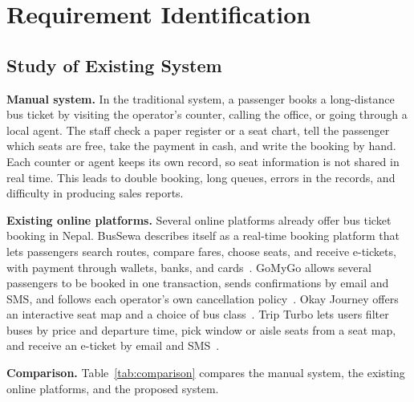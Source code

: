 
\section{Requirement Identification}

\subsection{Study of Existing System}

\textbf{Manual system.} In the traditional system, a passenger books a long-distance bus ticket by visiting the operator's counter, calling the office, or going through a local agent. The staff check a paper register or a seat chart, tell the passenger which seats are free, take the payment in cash, and write the booking by hand. Each counter or agent keeps its own record, so seat information is not shared in real time. This leads to double booking, long queues, errors in the records, and difficulty in producing sales reports.

\textbf{Existing online platforms.} Several online platforms already offer bus ticket booking in Nepal. BusSewa describes itself as a real-time booking platform that lets passengers search routes, compare fares, choose seats, and receive e-tickets, with payment through wallets, banks, and cards~\cite{bussewa}. GoMyGo allows several passengers to be booked in one transaction, sends confirmations by email and SMS, and follows each operator's own cancellation policy~\cite{gomygo}. Okay Journey offers an interactive seat map and a choice of bus class~\cite{okayjourney}. Trip Turbo lets users filter buses by price and departure time, pick window or aisle seats from a seat map, and receive an e-ticket by email and SMS~\cite{tripturbo}.

\textbf{Comparison.} Table~\ref{tab:comparison} compares the manual system, the existing online platforms, and the proposed system.

